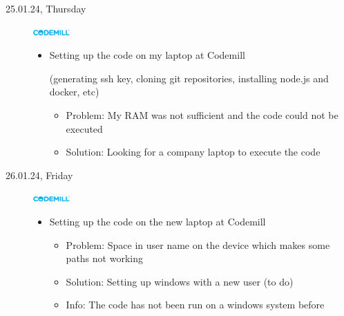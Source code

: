 \documentclass[a4, 11pt]{scrartcl}
\begin{document}
\begin{description}
\item[25.01.24, Thursday]
\includegraphics[width=1.4cm]{codemill.png}
\begin{itemize}
	\item Setting up the code on my laptop at Codemill 
	
	(generating ssh key, cloning git repositories, installing node.js and docker, etc)
	\begin{itemize}
		\item Problem: My RAM was not sufficient and the code could not be executed
		\item Solution: Looking for a company laptop to execute the code
	\end{itemize}
\end{itemize}


















\item[26.01.24, Friday]
\includegraphics[width=1.4cm]{codemill.png}
\begin{itemize}
	\item Setting up the code on the new laptop at Codemill
	\begin{itemize}
		\item Problem: Space in user name on the device which makes some paths not working
		\item Solution: Setting up windows with a new user (to do)
		\item Info: The code has not been run on a windows system before
	\end{itemize}
\end{itemize}

	\end{description}
\end{document}
